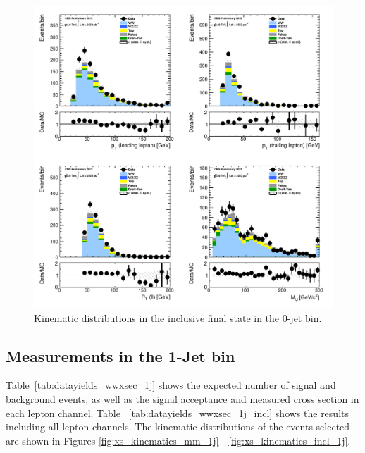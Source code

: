 \begin{figure}[!hbtp]
\centering
\includegraphics[width=1\textwidth]{figures/ww_analysis20_0_ALL_incl_0j.pdf} %
\caption{Kinematic distributions in the inclusive final state in the 0-jet bin.}
\label{fig:xs_kinematics_incl_0j}
\end{figure}

\clearpage
\subsection{Measurements in the 1-Jet bin}

Table~\ref{tab:datayields_wwxsec_1j} shows the expected number of signal and background events,
as well as the signal acceptance and measured cross section in each lepton channel.
Table ~\ref{tab:datayields_wwxsec_1j_incl} shows the results including all lepton channels.
The kinematic distributions of the events selected are shown in Figures \ref{fig:xs_kinematics_mm_1j} - \ref{fig:xs_kinematics_incl_1j}.

